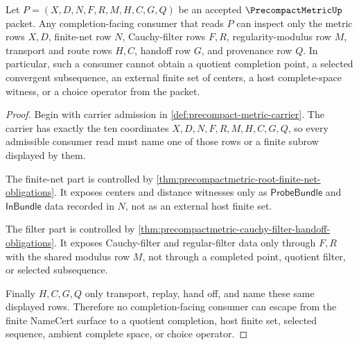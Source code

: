 \begin{theorem}
\label{thm:precompactmetric-completion-consumer-nonescape}
Let $P=(X,D,N,F,R,M,H,C,G,Q)$ be an accepted $\PrecompactMetricUp$ packet. Any completion-facing consumer that reads $P$ can inspect only the metric rows $X,D$, finite-net row $N$, Cauchy-filter rows $F,R$, regularity-modulus row $M$, transport and route rows $H,C$, handoff row $G$, and provenance row $Q$. In particular, such a consumer cannot obtain a quotient completion point, a selected convergent subsequence, an external finite set of centers, a host complete-space witness, or a choice operator from the packet.
\end{theorem}
\begin{proof}
Begin with carrier admission in \autoref{def:precompact-metric-carrier}. The carrier has exactly the ten coordinates $X,D,N,F,R,M,H,C,G,Q$, so every admissible consumer read must name one of those rows or a finite subrow displayed by them.

The finite-net part is controlled by \autoref{thm:precompactmetric-root-finite-net-obligations}. It exposes centers and distance witnesses only as $\mathsf{ProbeBundle}$ and $\mathsf{InBundle}$ data recorded in $N$, not as an external host finite set.

The filter part is controlled by \autoref{thm:precompactmetric-cauchy-filter-handoff-obligations}. It exposes Cauchy-filter and regular-filter data only through $F,R$ with the shared modulus row $M$, not through a completed point, quotient filter, or selected subsequence.

Finally $H,C,G,Q$ only transport, replay, hand off, and name these same displayed rows. Therefore no completion-facing consumer can escape from the finite NameCert surface to a quotient completion, host finite set, selected sequence, ambient complete space, or choice operator.
\end{proof}

